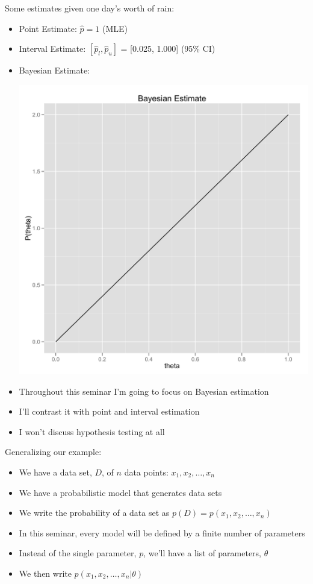 \documentclass{beamer}
\begin{document}
\frame
{
 Some estimates given one day's worth of rain:
 \begin{itemize}
   \item{Point Estimate: $\hat{p} = 1$ (MLE)}
   \item{Interval Estimate: $[\hat{p}_{l}, \hat{p}_{u}]$ = [0.025, 1.000] (95\% CI)}
   \item{Bayesian Estimate:}
   \begin{center}
     \includegraphics[scale = 0.075]{sample_beta.png}
    \end{center}
 \end{itemize}
}

\frame
{
  \begin{itemize}
    \item{Throughout this seminar I'm going to focus on Bayesian estimation}
    \item{I'll contrast it with point and interval estimation}
    \item{I won't discuss hypothesis testing at all}
  \end{itemize}
}

\frame
{
  Generalizing our example:
  \begin{itemize}
    \item{We have a data set, $D$, of $n$ data points: $x_1, x_2, \ldots, x_n$}
    \item{We have a probabilistic model that generates data sets}
    \item{We write the probability of a data set as $p(D) = p(x_1, x_2, \ldots, x_n)$}
    \item{In this seminar, every model will be defined by a finite number of parameters}
    \item{Instead of the single parameter, $p$, we'll have a list of parameters, $\theta$}
    \item{We then write $p(x_1, x_2, \ldots, x_n | \theta)$}
  \end{itemize}
}
\end{document}
